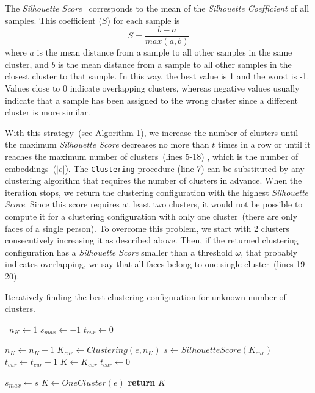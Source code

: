 The \emph{Silhouette Score}~\cite{rousseeuw1987silhouettes} corresponds to the mean of the \emph{Silhouette Coefficient} of all samples.
This coefficient ($S$) for each sample is 
\begin{equation}
\label{equation:Silh}
    S = \frac{b-a}{max(a,b)} 
\end{equation}
where $a$ is the mean distance from a sample to all other samples in the same cluster, and $b$ is the mean distance from a sample to all other samples in the closest cluster to that sample.
In this way, the best value is 1 and the worst is -1. Values close to 0 indicate overlapping clusters, whereas negative values usually indicate that a sample has been assigned to the wrong cluster since a different cluster is more similar.

With this strategy~(see Algorithm 1), we increase the number of clusters until the maximum \emph{Silhouette Score} decreases no more than $t$ times in a row or until it reaches the maximum number of clusters~(lines 5-18)
, which is the number of embeddings~($|e|$).
The \texttt{Clustering} procedure (line 7)
can be substituted by any clustering algorithm that requires the number of clusters in advance.
When the iteration stops, we return the clustering configuration with the highest \emph{Silhouette Score}.
Since this score requires at least two clusters, it would not be possible to compute it for a clustering configuration with only one cluster~(there are only faces of a single person).
To overcome this problem, we start with 2 clusters consecutively increasing it as described above. Then, if the returned clustering configuration has a \emph{Silhouette Score} smaller than a threshold $\omega$, that probably indicates overlapping, we say that all faces belong to one single cluster~(lines 19-20). 

\begin{algorithm}
\small
\caption{Iteratively finding the best clustering configuration for unknown number of clusters.}\label{clustering_alg}
\begin{algorithmic}[1]
\
\State $n_K\gets 1$
\State $s_{max}\gets -1$
\State $t_{cur}\gets 0$ 

    \State $n_K\gets n_K+1$
    \State $K_{cur}\gets Clustering(e, n_K)$
    \State $s \gets SilhouetteScore(K_{cur})$
        \State $t_{cur}\gets t_{cur}+1$
    \Else
        \State $K\gets K_{cur}$
        \State $t_{cur}\gets 0$
        
            \State $s_{max} \gets s$
        \EndIf
    \EndIf
\EndWhile
{}
    \State $K\gets OneCluster(e)$
\EndIf
\State \textbf{return} $K$
\EndProcedure
\end{algorithmic}
\end{algorithm}

